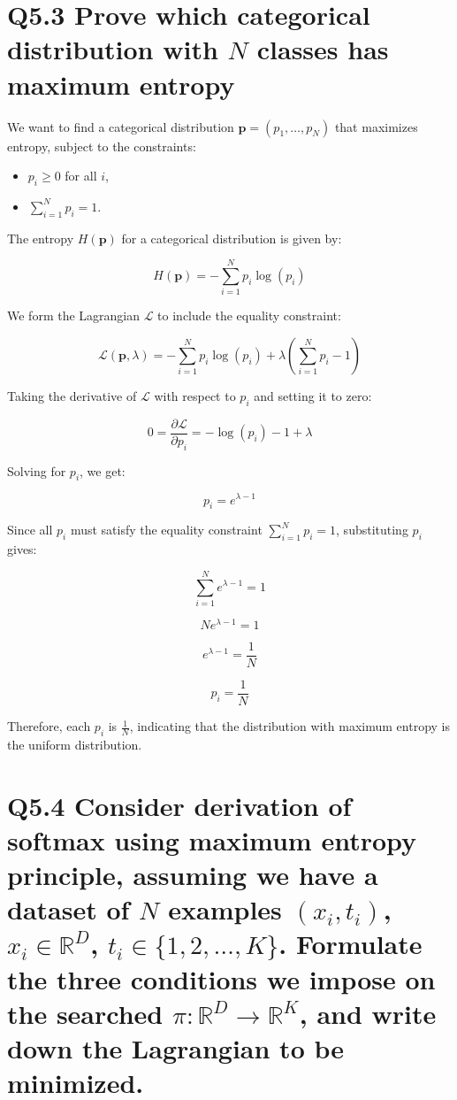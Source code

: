 \documentclass[11pt]{article}
\begin{document}
\section{Q5.3 Prove which categorical distribution with $N$ classes has maximum entropy}

We want to find a categorical distribution \( \mathbf{p} = (p_1, \ldots, p_N) \) that maximizes entropy, subject to the constraints:

\begin{itemize}
    \item \( p_i \geq 0 \) for all \( i \),
    \item \( \sum_{i=1}^{N} p_i = 1 \).
\end{itemize}

The entropy \( H(\mathbf{p}) \) for a categorical distribution is given by:

\[ H(\mathbf{p}) = -\sum_{i=1}^{N} p_i \log(p_i) \]

We form the Lagrangian \( \mathcal{L} \) to include the equality constraint:

\[ \mathcal{L}(\mathbf{p}, \lambda) = -\sum_{i=1}^{N} p_i \log(p_i) + \lambda \left( \sum_{i=1}^{N} p_i - 1 \right) \]

Taking the derivative of \( \mathcal{L} \) with respect to \( p_i \) and setting it to zero:

\[ 0 = \frac{\partial \mathcal{L}}{\partial p_i} = -\log(p_i) - 1 + \lambda \]

Solving for \( p_i \), we get:

\[ p_i = e^{\lambda - 1} \]

Since all \( p_i \) must satisfy the equality constraint \( \sum_{i=1}^{N} p_i = 1 \), substituting \( p_i \) gives:

\[ \sum_{i=1}^{N} e^{\lambda - 1} = 1 \]

\[ N e^{\lambda - 1} = 1 \]

\[ e^{\lambda - 1} = \frac{1}{N} \]

\[ p_i = \frac{1}{N} \]

Therefore, each \( p_i \) is \( \frac{1}{N} \), indicating that the distribution with maximum entropy is the uniform distribution.

\section{Q5.4 Consider derivation of softmax using maximum entropy principle, assuming we have a dataset of $N$ examples $(x_i,t_i)$, $x_i \in \mathbb{R}^D$, $t_i \in \{1,2,\ldots,K\}$. Formulate the three conditions we impose on the searched $\pi:\mathbb{R}^D \rightarrow \mathbb{R}^K$, and write down the Lagrangian to be minimized.}
\end{document}
